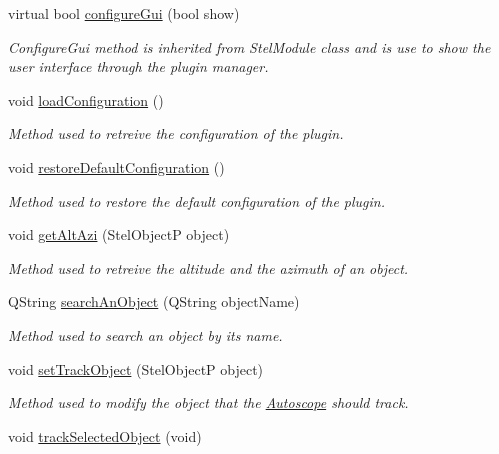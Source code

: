 \begin{DoxyCompactItemize}
virtual bool \mbox{\hyperlink{class_autoscope_a1a3fca34a12ae80391943194340d2c7e}{configure\+Gui}} (bool show)
\begin{DoxyCompactList}\small\item\em Configure\+Gui method is inherited from Stel\+Module class and is use to show the user interface through the plugin manager. \end{DoxyCompactList}\item 
void \mbox{\hyperlink{class_autoscope_af24c123f39ace0191799b5c20ceca7a6}{load\+Configuration}} ()
\begin{DoxyCompactList}\small\item\em Method used to retreive the configuration of the plugin. \end{DoxyCompactList}\item 
void \mbox{\hyperlink{class_autoscope_a2c5424afe3270c6069e0109834dd52b5}{restore\+Default\+Configuration}} ()
\begin{DoxyCompactList}\small\item\em Method used to restore the default configuration of the plugin. \end{DoxyCompactList}\item 
void \mbox{\hyperlink{class_autoscope_af61a84b86f02cc55472c53cc79b025b2}{get\+Alt\+Azi}} (Stel\+ObjectP object)
\begin{DoxyCompactList}\small\item\em Method used to retreive the altitude and the azimuth of an object. \end{DoxyCompactList}\item 
Q\+String \mbox{\hyperlink{class_autoscope_af1d803331f5ab5f5ff5d3839df8952c7}{search\+An\+Object}} (Q\+String object\+Name)
\begin{DoxyCompactList}\small\item\em Method used to search an object by it\textquotesingle{}s name. \end{DoxyCompactList}\item 
void \mbox{\hyperlink{class_autoscope_a0a616d2998641471cb6785e2abb6e7b5}{set\+Track\+Object}} (Stel\+ObjectP object)
\begin{DoxyCompactList}\small\item\em Method used to modify the object that the \mbox{\hyperlink{class_autoscope}{Autoscope}} should track. \end{DoxyCompactList}\item 
void \mbox{\hyperlink{class_autoscope_a5782dc8cf3afeb9710240fdc98d0caa1}{track\+Selected\+Object}} (void)

\end{DoxyCompactItemize}
